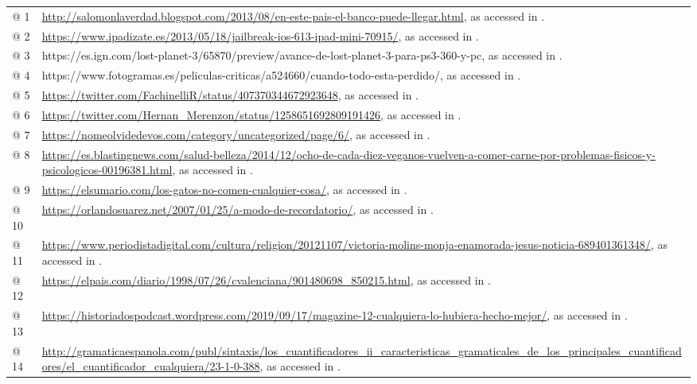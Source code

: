 \documentclass[output=paper]{langscibook}
\begin{document}
\begin{tabularx}{\textwidth}{XX}

\lsptoprule
@ 1 & \url{http://salomonlaverdad.blogspot.com/2013/08/en-este-pais-el-banco-puede-llegar.html}, as accessed in \citealt{Februar2021}.\\
@ 2 & \url{https://www.ipadizate.es/2013/05/18/jailbreak-ios-613-ipad-mini-70915/}, as accessed in \citealt{Februar2020}.\\
@ 3 & https://es.ign.com/lost-planet-3/65870/preview/avance-de-lost-planet-3-para-ps3-360-y-pc, as accessed in \citealt{June2021}.\\
@ 4 & https://www.fotogramas.es/peliculas-criticas/a524660/cuando-todo-esta-perdido/, as accessed in \citealt{June2021}.\\
@ 5 & \url{https://twitter.com/FachinelliR/status/407370344672923648}, as accessed in \citealt{May2021}.\\
@ 6 & \url{https://twitter.com/Hernan_Merenzon/status/1258651692809191426}, as accessed in \citealt{May2021}.\\
@ 7 & \url{https://nomeolvidedevos.com/category/uncategorized/page/6/}, as accessed in \citealt{May2021}.\\
@ 8 & \url{https://es.blastingnews.com/salud-belleza/2014/12/ocho-de-cada-diez-veganos-vuelven-a-comer-carne-por-problemas-fisicos-y-psicologicos-00196381.html}, as accessed in \citealt{Februar2020}.\\
@ 9 & \url{https://elsumario.com/los-gatos-no-comen-cualquier-cosa/}, as accessed in \citealt{May2021}.\\
@ 10 & \url{https://orlandosuarez.net/2007/01/25/a-modo-de-recordatorio/}, as accessed in \citealt{May2021}.\\
@ 11 & \url{https://www.periodistadigital.com/cultura/religion/20121107/victoria-molins-monja-enamorada-jesus-noticia-689401361348/}, as accessed in \citealt{May2021}.\\
@ 12 & \url{https://elpais.com/diario/1998/07/26/cvalenciana/901480698_850215.html}, as accessed in \citealt{December2020}. \\
@ 13 & \url{https://historiadospodcast.wordpress.com/2019/09/17/magazine-12-cualquiera-lo-hubiera-hecho-mejor/}, as accessed in \citealt{December2020}.\\
@ 14 & \url{http://gramaticaespanola.com/publ/sintaxis/los_cuantificadores_ii_caracteristicas_gramaticales_de_los_principales_cuantificadores/el_cuantificador_cualquiera/23-1-0-388}, as accessed in \citealt{December2020}.\\

\end{tabularx}
\end{document}

